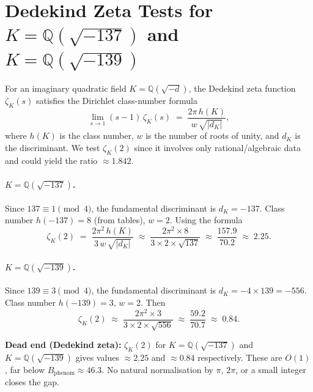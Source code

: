 \documentclass[12pt,a4paper]{article}
\theoremstyle{definition}
\theoremstyle{remark}
\begin{document}
\section{Dedekind Zeta Tests for $K = \mathbb{Q}(\sqrt{-137})$ and
         $K = \mathbb{Q}(\sqrt{-139})$}
\label{sec:dedekind_zeta}

For an imaginary quadratic field $K = \mathbb{Q}(\sqrt{-d})$, the Dedekind
zeta function $\zeta_K(s)$ satisfies the Dirichlet class-number formula
\begin{equation}
  \lim_{s\to 1}(s-1)\,\zeta_K(s)
  \;=\; \frac{2\pi\,h(K)}{w\,\sqrt{|d_K|}},
\end{equation}
where $h(K)$ is the class number, $w$ is the number of roots of unity, and
$d_K$ is the discriminant.  We test $\zeta_K(2)$ since it involves only
rational/algebraic data and could yield the ratio $\approx 1.842$.

\paragraph{$K = \mathbb{Q}(\sqrt{-137})$.}
Since $137 \equiv 1 \pmod{4}$, the fundamental discriminant is $d_K = -137$.
Class number $h(-137) = 8$ (from tables), $w = 2$.  Using the formula
\begin{equation}
  \zeta_K(2)
  \;=\; \frac{2\pi^2\,h(K)}{3\,w\,\sqrt{|d_K|}}
  \;\approx\; \frac{2\pi^2 \times 8}{3 \times 2 \times \sqrt{137}}
  \;\approx\; \frac{157.9}{70.2}
  \;\approx\; 2.25 .
\end{equation}

\paragraph{$K = \mathbb{Q}(\sqrt{-139})$.}
Since $139 \equiv 3 \pmod{4}$, the fundamental discriminant is
$d_K = -4 \times 139 = -556$.
Class number $h(-139) = 3$, $w = 2$.  Then
\begin{equation}
  \zeta_K(2)
  \;\approx\; \frac{2\pi^2 \times 3}{3 \times 2 \times \sqrt{556}}
  \;\approx\; \frac{59.2}{70.7}
  \;\approx\; 0.84 .
\end{equation}

\begin{deadendbox}
\textbf{Dead end (Dedekind zeta):}
$\zeta_K(2)$ for $K = \mathbb{Q}(\sqrt{-137})$ and $K = \mathbb{Q}(\sqrt{-139})$
gives values $\approx 2.25$ and $\approx 0.84$ respectively.  These are
$O(1)$, far below $B_{\mathrm{phenom}} \approx 46.3$.  No natural
normalisation by $\pi$, $2\pi$, or a small integer closes the gap.
\end{deadendbox}
\end{document}
